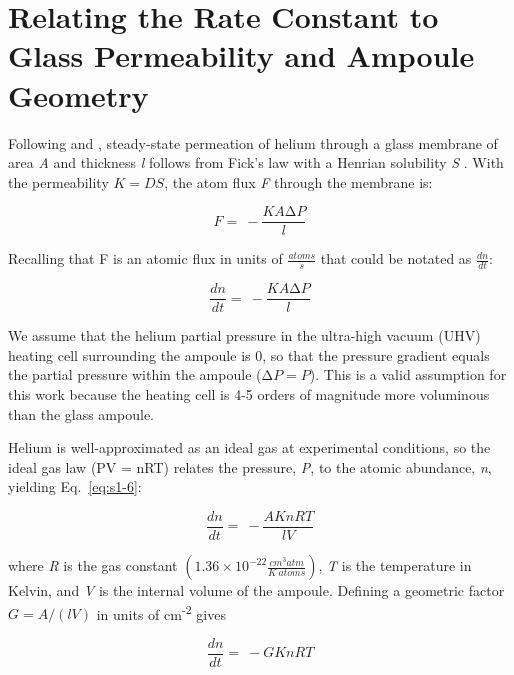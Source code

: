 \section{Relating the Rate Constant to Glass Permeability and Ampoule Geometry}\label{sec:s-lambda-K}

Following \citet{rogers1954} and \citet{altemose1961}, steady-state permeation of helium through a glass membrane of area \emph{A} and thickness \emph{l} follows from Fick's law with a Henrian solubility \emph{S} \citep{shelby1976}. With the permeability \(K = DS\), the atom flux \emph{F} through the membrane is:

\begin{equation}
F = \  - \frac{KA\mathrm{\Delta}P}{l}
\label{eq:s1-4}
\end{equation}

Recalling that F is an atomic flux in units of \(\frac{atoms}{s}\) that
could be notated as \(\frac{dn}{dt}\):

\begin{equation}
\frac{dn}{dt} = \  - \frac{KA\mathrm{\Delta}P}{l}
\label{eq:s1-5}
\end{equation}

We assume that the helium partial pressure in the ultra-high vacuum (UHV)
heating cell surrounding the ampoule is 0, so that the pressure gradient
equals the partial pressure within the ampoule
(\(\mathrm{\Delta}P = P\)). This is a valid assumption for this work
because the heating cell is 4-5 orders of magnitude more voluminous than
the glass ampoule.

Helium is well-approximated as an ideal gas at experimental conditions, so the ideal gas law (PV = nRT) relates the pressure, \emph{P}, to the atomic abundance, \emph{n}, yielding Eq.~\eqref{eq:s1-6}:

\begin{equation}
\frac{dn}{dt} = \  - \frac{AKnRT}{lV}
\label{eq:s1-6}
\end{equation}

where \emph{R} is the gas constant \(\left( 1.36 \times 10^{- 22}\frac{cm^{3}atm}{K\ atoms} \right)\), \emph{T} is the temperature in Kelvin, and \emph{V} is the internal volume of the ampoule. Defining a geometric factor \(G = A/(lV)\) in units of cm\textsuperscript{-2} gives

\begin{equation}
\label{eq:permodeK}
\frac{dn}{dt} = \  - GKnRT
\end{equation}

